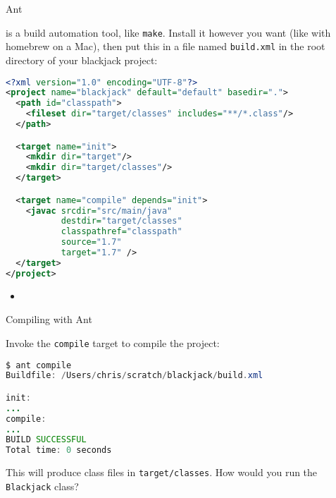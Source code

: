 \documentclass{beamer}
\author[Chris Simpkins]
{Christopher Simpkins \\\texttt{chris.simpkins@gatech.edu}}
\institute[Georgia Tech] %
\date[CS 1331]{}
\begin{document}
\begin{frame}
  \titlepage
\end{frame}


\begin{frame}[fragile]{Ant}

\vspace{-.07in}
 is a build automation tool, like {\tt make}.  Install it however you want (like with homebrew on a Mac), then put this in a file named {\tt build.xml} in the root directory of your blackjack project:
\vspace{-.07in}
\begin{lstlisting}[language=xml]
<?xml version="1.0" encoding="UTF-8"?>
<project name="blackjack" default="default" basedir=".">
  <path id="classpath">
    <fileset dir="target/classes" includes="**/*.class"/>
  </path>

  <target name="init">
    <mkdir dir="target"/>
    <mkdir dir="target/classes"/>
  </target>

  <target name="compile" depends="init">
    <javac srcdir="src/main/java"
           destdir="target/classes"
           classpathref="classpath"
           source="1.7"
           target="1.7" />
  </target>
</project>
\end{lstlisting}

\begin{itemize}
\item
\end{itemize}


\end{frame}

\begin{frame}[fragile]{Compiling with Ant}


Invoke the {\tt compile} target to compile the project:
\begin{lstlisting}[language=Java]
$ ant compile
Buildfile: /Users/chris/scratch/blackjack/build.xml

init:
...
compile:
...
BUILD SUCCESSFUL
Total time: 0 seconds
\end{lstlisting}

This will produce class files in {\tt target/classes}.  How would you run the {\tt Blackjack} class?

\end{frame}
\end{document}
